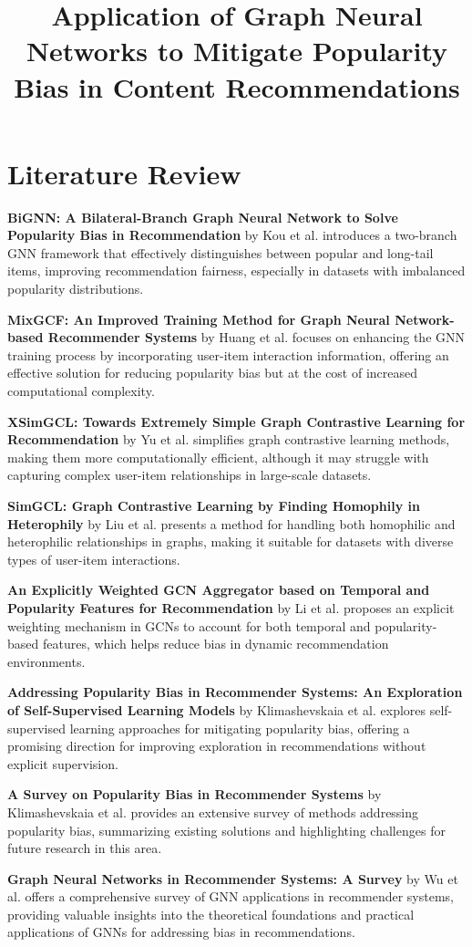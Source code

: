\documentclass[12pt]{article}
\title{Application of Graph Neural Networks to Mitigate Popularity Bias in Content Recommendations}
\date{}
\begin{document}
\maketitle

\section*{Literature Review}

\textbf{BiGNN: A Bilateral-Branch Graph Neural Network to Solve Popularity Bias in Recommendation} by Kou et al. introduces a two-branch GNN framework
that effectively distinguishes between popular and long-tail items, improving recommendation fairness, especially in datasets
with imbalanced popularity distributions.

\textbf{MixGCF: An Improved Training Method for Graph Neural Network-based Recommender Systems} by Huang et al. focuses on enhancing the GNN training
process by incorporating user-item interaction information, offering an effective solution for reducing popularity bias but at the cost of increased
computational complexity.

\textbf{XSimGCL: Towards Extremely Simple Graph Contrastive Learning for Recommendation} by Yu et al. simplifies graph contrastive learning methods,
making them more computationally efficient, although it may struggle with capturing complex user-item relationships in large-scale datasets.

\textbf{SimGCL: Graph Contrastive Learning by Finding Homophily in Heterophily} by Liu et al. presents a method for handling both homophilic and
heterophilic relationships in graphs, making it suitable for datasets with diverse types of user-item interactions.

\textbf{An Explicitly Weighted GCN Aggregator based on Temporal and Popularity Features for Recommendation} by Li et al. proposes an explicit
weighting mechanism in GCNs to account for both temporal and popularity-based features, which helps reduce bias in dynamic recommendation environments.

\textbf{Addressing Popularity Bias in Recommender Systems: An Exploration of Self-Supervised Learning Models} by Klimashevskaia et al. explores
self-supervised learning approaches for mitigating popularity bias, offering a promising direction for improving exploration in recommendations
without explicit supervision.

\textbf{A Survey on Popularity Bias in Recommender Systems} by Klimashevskaia et al. provides an extensive survey of methods addressing
popularity bias, summarizing existing solutions and highlighting challenges for future research in this area.

\textbf{Graph Neural Networks in Recommender Systems: A Survey} by Wu et al. offers a comprehensive survey of GNN applications in recommender systems,
providing valuable insights into the theoretical foundations and practical applications of GNNs for addressing bias in recommendations.
\end{document}
